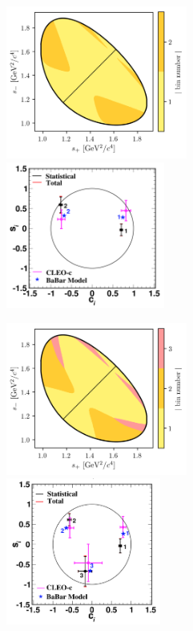 \begin{figure}[p]
    \centering
    \begin{subfigure}{\columnwidth}
        \centering
        \includegraphics[height=5cm,valign=t]{figures/theory/binnings/KsKK_2bins.png}
        \includegraphics[height=4.8cm,valign=t]{figures/theory/bes_kskk_2bins.png}
        \caption{}
        \label{fig:kskk_bins_2}
    \end{subfigure}
    \begin{subfigure}{\columnwidth}
        \centering
        \includegraphics[height=5cm,valign=t]{figures/theory/binnings/KsKK_3bins.png}
        \includegraphics[height=4.8cm,valign=t]{figures/theory/bes_kskk_3bins.png}

\end{subfigure}
\end{figure}
